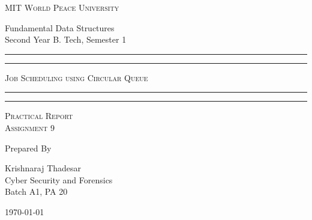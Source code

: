 \documentclass[11pt]{article}
\begin{document}
\begin{titlepage}
	\centering


	\huge\textsc{
		MIT World Peace University
	}\\

	\vspace{0.75\baselineskip} %

	\LARGE{
		Fundamental Data Structures\\
		Second Year B. Tech, Semester 1
	}

	\vfill %


	\rule{\textwidth}{1.6pt}\vspace*{-\baselineskip}\vspace*{2pt}
	\rule{\textwidth}{0.6pt}
	\vspace{0.75\baselineskip} %

	\huge{\textsc{
			Job Scheduling using Circular Queue
		}} \\



	\vspace{0.5\baselineskip} %
	\rule{\textwidth}{0.6pt}\vspace*{-\baselineskip}\vspace*{2.8pt}
	\rule{\textwidth}{1.6pt}

	\vspace{1\baselineskip} %


	\LARGE\textsc{
		Practical Report\\
		Assignment 9
	} %
	\vfill


	Prepared By
	\vspace{0.5\baselineskip} %

	\Large{
		Krishnaraj Thadesar \\
		Cyber Security and Forensics\\
		Batch A1, PA 20
	}


	\vspace{0.5\baselineskip} %
	\today

\end{titlepage}
\end{document}
